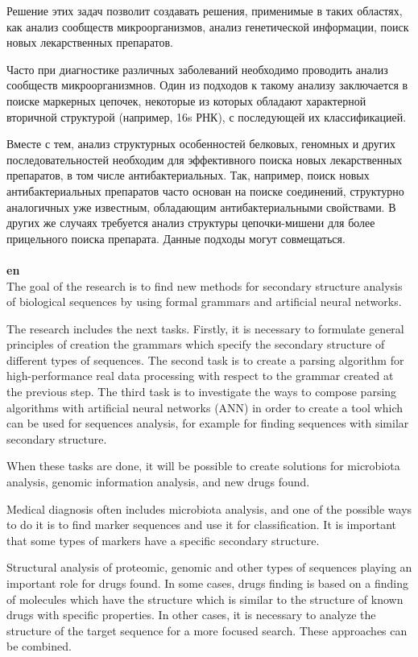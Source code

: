\documentclass[12pt]{article}  %
\theoremstyle{remark}
\begin{document}
Решение этих задач позволит создавать решения, применимые в таких областях, как анализ сообществ микроорганизмов, анализ генетической информации, поиск новых лекарственных препаратов.

Часто при диагностике различных заболеваний необходимо проводить анализ сообществ микроорганизмнов. Один из подходов к такому анализу заключается в поиске маркерных цепочек, некоторые из которых обладают характерной вторичной структурой (например, 16s РНК), с последующей их классификацией.

Вместе с тем, анализ структурных особенностей белковых, геномных и других последовательностей необходим для эффективного поиска новых лекарственных препаратов, в том числе антибактериальных. Так, например, поиск новых антибактериальных препаратов часто основан на поиске соединений, структурно аналогичных уже известным, обладающим антибактериальными свойствами. В других же случаях требуется анализ структуры цепочки-мишени для более прицельного поиска препарата. Данные подходы могут совмещаться.
\\
\\
\textbf{en}\\
The goal of the research is to find new methods for secondary structure analysis of biological sequences by using formal grammars and artificial neural networks.

The research includes the next tasks.
Firstly, it is necessary to formulate general principles of creation the grammars which specify the secondary structure of different types of sequences.
The second task is to create a parsing algorithm for high-performance real data processing with respect to the grammar created at the previous step.
The third task is to investigate the ways to compose parsing algorithms with artificial neural networks (ANN) in order to create a tool which can be used for sequences analysis, for example for finding sequences with similar secondary structure.

When these tasks are done, it will be possible to create solutions for microbiota analysis, genomic information analysis, and new drugs found.

Medical diagnosis often includes microbiota analysis, and one of the possible ways to do it is to find marker sequences and use it for classification. It is important that some types of markers have a specific secondary structure.

Structural analysis of proteomic, genomic and other types of sequences playing an important role for drugs found. In some cases, drugs finding is based on a finding of molecules which have the structure which is similar to the structure of known drugs with specific properties. In other cases, it is necessary to analyze the structure of the target sequence for a more focused search. These approaches can be combined.
\end{document}
